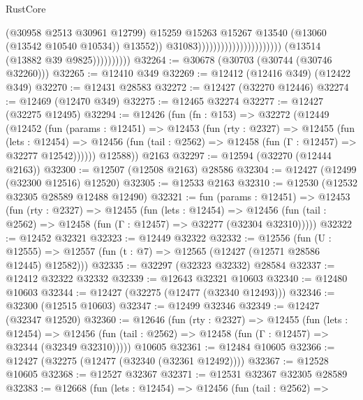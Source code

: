 \begin{lexlean}{RustCore}
\begin{coremodule}
                                                                    (@30958 @2513 @30961 @12799)
                                                                    @15259
                                                                    @15263
                                                                    @15267
                                                                    @13540
                                                                    (@13060 (@13542 @10540 @10534))
                                                                    @13552))
                                                                @31083))))))))))))))))))))))
                    (@13514 (@13882 @39 @9825))))))))))
@32264 := @30678 (@30703 (@30744 (@30746 @32260)))
@32265 := @12410 @349
@32269 := @12412 (@12416 @349) (@12422 @349)
@32270 := @12431 @28583
@32272 := @12427 (@32270 @12446)
@32274 := @12469 (@12470 @349)
@32275 := @12465 @32274
@32277 := @12427 (@32275 @12495)
@32294 := @12426
    (fun (fn : @153) =>
    @32272
      (@12449
        (@12452
          (fun (params : @12451) =>
          @12453
            (fun (rty : @2327) =>
            @12455
              (fun (lets : @12454) =>
              @12456 (fun (tail : @2562) => @12458 (fun (Γ : @12457) => @32277 @12542))))))
        @12588))
    @2163
@32297 := @12594 (@32270 (@12444 @2163))
@32300 := @12507 (@12508 @2163) @28586
@32304 := @12427 (@12499 (@32300 @12516) @12520)
@32305 := @12533 @2163
@32310 := @12530 (@12532 @32305 @28589 @12488 @12490)
@32321 := fun (params : @12451) =>
  @12453
    (fun (rty : @2327) =>
    @12455
      (fun (lets : @12454) =>
      @12456 (fun (tail : @2562) => @12458 (fun (Γ : @12457) => @32277 (@32304 @32310)))))
@32322 := @12452 @32321
@32323 := @12449 @32322
@32332 := @12556
    (fun (U : @12555) => @12557 (fun (t : @7) => @12565 (@12427 (@12571 @28586 @12445) @12582)))
@32335 := @32297 (@32323 @32332) @28584
@32337 := @12412 @32322 @32332
@32339 := @12643 @32321 @10603
@32340 := @12480 @10603
@32344 := @12427 (@32275 (@12477 (@32340 @12493)))
@32346 := @32300 (@12515 @10603)
@32347 := @12499 @32346
@32349 := @12427 (@32347 @12520)
@32360 := @12646
    (fun (rty : @2327) =>
    @12455
      (fun (lets : @12454) =>
      @12456 (fun (tail : @2562) => @12458 (fun (Γ : @12457) => @32344 (@32349 @32310)))))
    @10605
@32361 := @12484 @10605
@32366 := @12427 (@32275 (@12477 (@32340 (@32361 @12492))))
@32367 := @12528 @10605
@32368 := @12527 @32367
@32371 := @12531 @32367 @32305 @28589
@32383 := @12668
    (fun (lets : @12454) =>
    @12456
      (fun (tail : @2562) =>

\end{coremodule}
\end{lexlean}
